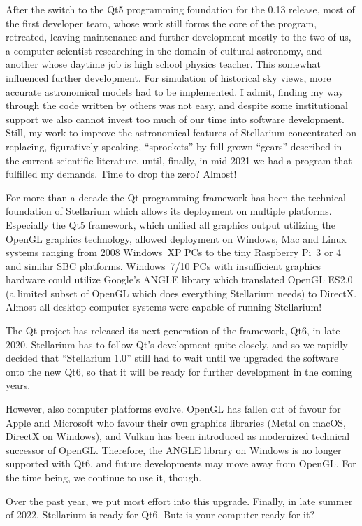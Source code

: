 After the switch to the Qt5 programming foundation for the 0.13
release, most of the first developer team, whose work still forms the
core of the program, retreated, leaving maintenance and further
development mostly to the two of us, a computer scientist researching
in the domain of cultural astronomy, and another whose daytime job is
high school physics teacher. This somewhat influenced further
development. For simulation of historical sky views, more accurate
astronomical models had to be implemented. I admit, finding my way
through the code written by others was not easy, and despite some
institutional support we also cannot invest too much of our time into
software development. Still, my work to improve the astronomical
features of Stellarium concentrated on replacing, figuratively
speaking, ``sprockets'' by full-grown ``gears'' described in the
current scientific literature, until, finally, in mid-2021 we had a
program that fulfilled my demands. Time to drop the zero? Almost!

For more than a decade the Qt programming framework has been the
technical foundation of Stellarium which allows its deployment on
multiple platforms. Especially the Qt5 framework, which unified all
graphics output utilizing the OpenGL graphics technology, allowed
deployment on Windows, Mac and Linux systems ranging from 2008
Windows~XP PCs to the tiny Raspberry Pi~3 or 4 and similar SBC platforms. Windows~7/10
PCs with insufficient graphics hardware could utilize Google's ANGLE
library which translated OpenGL ES2.0 (a limited subset of OpenGL
which does everything Stellarium needs) to DirectX. Almost all desktop
computer systems were capable of running Stellarium!

The Qt project has released its next generation of the framework, Qt6,
in late 2020. Stellarium has to follow Qt's development quite closely,
and so we rapidly decided that ``Stellarium 1.0'' still had to wait
until we upgraded the software onto the new Qt6, so that it will be
ready for further development in the coming years.

However, also computer platforms evolve. OpenGL has fallen out of
favour for Apple and Microsoft who favour their own graphics
libraries (Metal on macOS, DirectX on Windows), and Vulkan has been
introduced as modernized technical
successor of OpenGL. Therefore, the ANGLE library on Windows is no
longer supported with Qt6, and future developments may move away from
OpenGL. For the time being, we continue to use it, though.

Over the past year, we put most effort into this upgrade. Finally, in
late summer of 2022, Stellarium is ready for Qt6. But: is your computer
ready for it?

